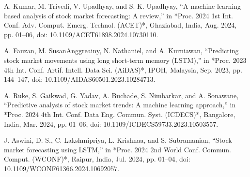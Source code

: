 \documentclass[conference]{IEEEtran}
\begin{document}
\begin{thebibliography}{00}

 A. Kumar, M. Trivedi, V. Upadhyay, and S. K. Upadhyay, ``A machine learning-based analysis of stock market forecasting: A review,'' in *Proc. 2024 1st Int. Conf. Adv. Comput. Emerg. Technol. (ACET)*, Ghaziabad, India, Aug. 2024, pp. 01--06, doi: 10.1109/ACET61898.2024.10730110.

 A. Fauzan, M. SusanAnggreainy, N. Nathaniel, and A. Kurniawan, ``Predicting stock market movements using long short-term memory (LSTM),'' in *Proc. 2023 4th Int. Conf. Artif. Intell. Data Sci. (AiDAS)*, IPOH, Malaysia, Sep. 2023, pp. 144--147, doi: 10.1109/AIDAS60501.2023.10284713.

 A. Ruke, S. Gaikwad, G. Yadav, A. Buchade, S. Nimbarkar, and A. Sonawane, ``Predictive analysis of stock market trends: A machine learning approach,'' in *Proc. 2024 4th Int. Conf. Data Eng. Commun. Syst. (ICDECS)*, Bangalore, India, Mar. 2024, pp. 01--06, doi: 10.1109/ICDECS59733.2023.10503557.

 J. Aswini, D. S., C. Lakshmipriya, L. Krishnaa, and S. Subramanian, ``Stock market forecasting using LSTM,'' in *Proc. 2024 2nd World Conf. Commun. Comput. (WCONF)*, Raipur, India, Jul. 2024, pp. 01--04, doi: 10.1109/WCONF61366.2024.10692057.

\end{thebibliography}
\end{document}
